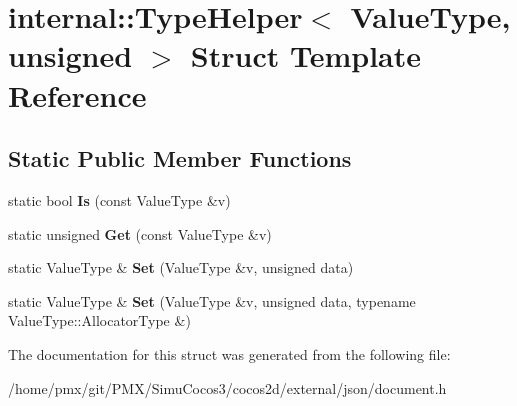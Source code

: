 \hypertarget{structinternal_1_1TypeHelper_3_01ValueType_00_01unsigned_01_4}{}\section{internal\+:\+:Type\+Helper$<$ Value\+Type, unsigned $>$ Struct Template Reference}
\label{structinternal_1_1TypeHelper_3_01ValueType_00_01unsigned_01_4}
\subsection*{Static Public Member Functions}
\begin{DoxyCompactItemize}
\item 
\mbox{\label{structinternal_1_1TypeHelper_3_01ValueType_00_01unsigned_01_4_ad1c1cb931ed166508d17e866d410c99b}} 
static bool {\bfseries Is} (const Value\+Type \&v)
\item 
\mbox{\label{structinternal_1_1TypeHelper_3_01ValueType_00_01unsigned_01_4_a2f91befe1e9e914e7431b84c0d89f572}} 
static unsigned {\bfseries Get} (const Value\+Type \&v)
\item 
\mbox{\label{structinternal_1_1TypeHelper_3_01ValueType_00_01unsigned_01_4_a1d960542fd618ac649fe4e045c44f789}} 
static Value\+Type \& {\bfseries Set} (Value\+Type \&v, unsigned data)
\item 
\mbox{\label{structinternal_1_1TypeHelper_3_01ValueType_00_01unsigned_01_4_a601b05a233b6025486a9105d45d46780}} 
static Value\+Type \& {\bfseries Set} (Value\+Type \&v, unsigned data, typename Value\+Type\+::\+Allocator\+Type \&)
\end{DoxyCompactItemize}


The documentation for this struct was generated from the following file\+:\begin{DoxyCompactItemize}
\item 
/home/pmx/git/\+P\+M\+X/\+Simu\+Cocos3/cocos2d/external/json/document.\+h\end{DoxyCompactItemize}
